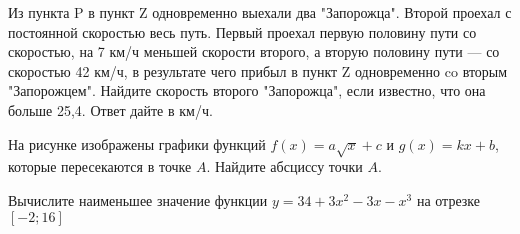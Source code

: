 \documentclass[twocolumn]{article}
\begin{document}
\begin{taskBN}{9}
Из пункта P в пункт Z одновременно выехали два "Запорожца". Второй проехал с постоянной скоростью весь путь. Первый проехал первую половину пути со скоростью, на 7 км/ч меньшей скорости второго, а вторую половину пути — со скоростью 42 км/ч, в результате чего прибыл в пункт Z одновременно co вторым "Запорожцем". Найдите скорость второго "Запорожца", если известно, что она больше 25,4. Ответ дайте в км/ч.
\end{taskBN}

\begin{taskBN}{10}
На рисунке изображены графики функций $f(x)=a\sqrt{x}+c$ и $g(x)=kx+b$, которые пересекаются в точке $A$. Найдите абсциссу точки $A$.\vspace{2.5cm}
\end{taskBN}

\begin{taskBN}{11}
Вычислите наименьшее значение функции $y =34+3x^{2}-3x-x^{3}$ на отрезке $\left[-2;16 \right]$
\end{taskBN}
\end{document}
